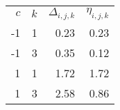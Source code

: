 \begin{tabular}{rrrr}
$c$ & $k$ & $\Delta_{i,j,k}$ & $\eta_{i,j,k}$ \\
-1 & 1 & 0.23 & 0.23 \\
-1 & 3 & 0.35 & 0.12 \\
1 & 1 & 1.72 & 1.72 \\
1 & 3 & 2.58 & 0.86 \\
\end{tabular}
